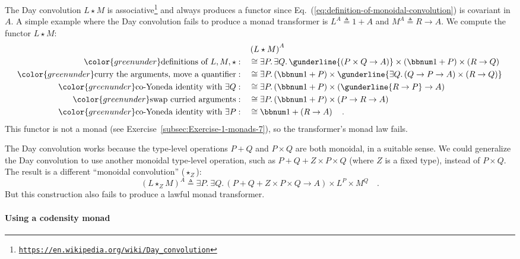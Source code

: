 The Day convolution $L\star M$ is associative\footnote{\texttt{\href{https://en.wikipedia.org/wiki/Day_convolution}{https://en.wikipedia.org/wiki/Day\_convolution}}}
and always produces a functor since Eq.~(\ref{eq:definition-of-monoidal-convolution})
is covariant in $A$. A simple example where the Day convolution fails
to produce a monad transformer is $L^{A}\triangleq1+A$ and $M^{A}\triangleq R\rightarrow A$.
We compute the functor $L\star M$:
\begin{align*}
 & \left(L\star M\right)^{A}\\
{\color{greenunder}\text{definitions of }L,M,\star:}\quad & \cong\exists P.\,\exists Q.\,\gunderline{\left(P\times Q\rightarrow A\right)}\times\left(\bbnum 1+P\right)\times\left(R\rightarrow Q\right)\\
{\color{greenunder}\text{curry the arguments, move a quantifier}:}\quad & \cong\exists P.\left(\bbnum 1+P\right)\times\gunderline{\exists Q.\left(Q\rightarrow P\rightarrow A\right)\times\left(R\rightarrow Q\right)}\\
{\color{greenunder}\text{co-Yoneda identity with }\exists Q:}\quad & \cong\exists P.\left(\bbnum 1+P\right)\times\left(\gunderline{R\rightarrow P}\rightarrow A\right)\\
{\color{greenunder}\text{swap curried arguments}:}\quad & \cong\exists P.\left(\bbnum 1+P\right)\times\left(P\rightarrow R\rightarrow A\right)\\
{\color{greenunder}\text{co-Yoneda identity with }\exists P:}\quad & \cong\bbnum 1+\left(R\rightarrow A\right)\quad.
\end{align*}
This functor is not a monad (see Exercise~\ref{subsec:Exercise-1-monads-7}),
so the transformer\textsf{'}s monad law fails.

The Day convolution works because the type-level operations $P+Q$
and $P\times Q$ are both monoidal, in a suitable sense. We could
generalize the Day convolution to use another monoidal type-level
operation, such as $P+Q+Z\times P\times Q$ (where $Z$ is a fixed
type), instead of $P\times Q$. The result is a different \textsf{``}monoidal
convolution\textsf{''} ($\star_{Z}$):
\[
\left(L\star_{Z}M\right)^{A}\triangleq\exists P.\:\exists Q.\,\left(P+Q+Z\times P\times Q\rightarrow A\right)\times L^{P}\times M^{Q}\quad.
\]
But this construction also fails to produce a lawful monad transformer.

\paragraph{Using a codensity monad}

